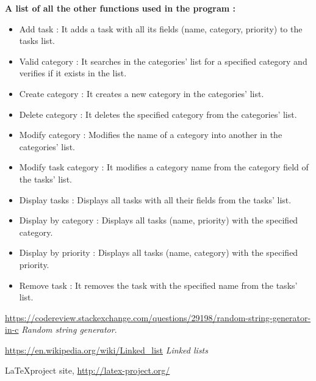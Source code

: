 \documentclass{article}
\begin{document}
\textbf{A list of all the other functions used in the program :}
    \begin{itemize}
        \item Add task : It adds a task with all its fields (name, category, priority) to the tasks list.
        
        \item Valid category : It searches in the categories' list for a specified category and verifies if it exists in the list.
        
        \item Create category : It creates a new category in the categories' list.
        
        \item Delete category : It deletes the specified category from the categories' list.
        
        \item Modify category : Modifies the name of a category into another in the categories' list.
        
        \item Modify task category : It modifies a category name from the category field of the tasks' list.
        
        \item Display tasks : Displays all tasks with all their fields from the tasks' list.
        
        \item Display by category : Displays all tasks (name, priority) with the specified category.
        
        \item Display by priority : Displays all tasks (name, category) with the specified priority.
        
        \item Remove task : It removes the task with the specified name from the tasks' list.

    \end{itemize}
    

\vspace{20cm}
\vfill



\begin{thebibliography}{9}
\label{sec_ref}

\url{https://codereview.stackexchange.com/questions/29198/random-string-generator-in-c}
\emph{Random string generator}.
 
\url{https://en.wikipedia.org/wiki/Linked_list}
\emph{Linked lists}

\LaTeX project site,
\url{http://latex-project.org/}

\end{thebibliography}
\end{document}
